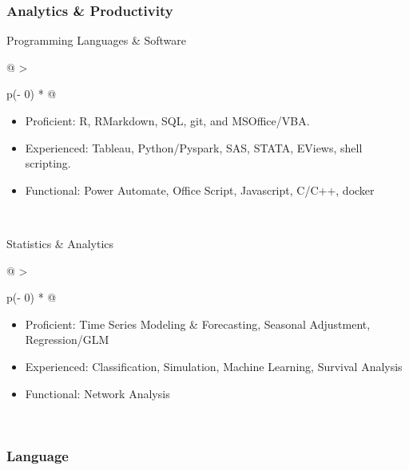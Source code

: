 \documentclass[
  letterpaper,
  DIV=11,
  numbers=noendperiod]{scrartcl}
\providecommand{\tightlist}{%
  \setlength{\itemsep}{0pt}\setlength{\parskip}{0pt}}\usepackage{longtable,booktabs,array}
\begin{document}
\hypertarget{analytics-productivity}{%
\subsubsection{Analytics \& Productivity}\label{analytics-productivity}}

Programming Languages \& Software

\begin{longtable}[]{@{}
  >{\raggedright\arraybackslash}p{(\columnwidth - 0\tabcolsep) * }@{}}
\toprule\noalign{}
\endhead
\bottomrule\noalign{}
\endlastfoot
\begin{minipage}[t]{\linewidth}\raggedright
\begin{itemize}
\tightlist
\item
  Proficient: R, RMarkdown, SQL, git, and MSOffice/VBA.
\item
  Experienced: Tableau, Python/Pyspark, SAS, STATA, EViews, shell
  scripting.
\item
  Functional: Power Automate, Office Script, Javascript, C/C++, docker
\end{itemize}
\end{minipage} \\
\end{longtable}

Statistics \& Analytics

\begin{longtable}[]{@{}
  >{\raggedright\arraybackslash}p{(\columnwidth - 0\tabcolsep) * }@{}}
\toprule\noalign{}
\endhead
\bottomrule\noalign{}
\endlastfoot
\begin{minipage}[t]{\linewidth}\raggedright
\begin{itemize}
\tightlist
\item
  Proficient: Time Series Modeling \& Forecasting, Seasonal Adjustment,
  Regression/GLM
\item
  Experienced: Classification, Simulation, Machine Learning, Survival
  Analysis
\item
  Functional: Network Analysis
\end{itemize}
\end{minipage} \\
\end{longtable}

\hypertarget{language}{%
\subsubsection{Language}\label{language}}
\end{document}
